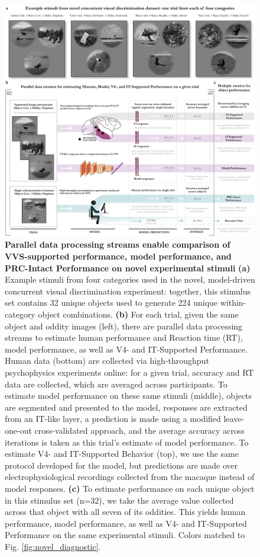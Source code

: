 \documentclass[11pt]{article}
\begin{document}
\begin{figure}[ht]
\centering
\includegraphics[width=\linewidth]{figures/novel_protocol_flow}
\caption{\textbf{Parallel data processing streams enable comparison of VVS-supported performance, model performance, and PRC-Intact Performance on novel experimental stimuli} \textbf{(a)} Example stimuli from four categories used in the novel, model-driven concurrent visual discrimination experiment: together, this stimulus set contains 32 unique objects used to generate 224 unique within-category object combinations. \textbf{(b)} For each trial, given the same object and oddity images (left), there are parallel data processing streams to estimate human performance and Reaction time (RT), model performance, as well as V4- and IT-Supported Performance. Human data (bottom) are collected via high-throughput psychophysics experiments online: for a given trial, accuracy and RT data are collected, which are averaged across participants. To estimate model performance on these same stimuli (middle), objects are segmented and presented to the model, responses are extracted from an IT-like layer, a prediction is made using a modified leave-one-out cross-validated approach, and the average accuracy across iterations is taken as this trial's estimate of model performance. To estimate V4- and IT-Supported Behavior (top), we use the same protocol developed for the model, but predictions are made over electrophysiological recordings collected from the macaque\cite{majaj2015simple} instead of model responses. \textbf{(c)} To estimate performance on each unique object in this stimulus set (n=32), we take the average value collected across that object with all seven of its oddities. This yields human performance, model performance, as well as V4- and IT-Supported Performance on the same experimental stimuli. Colors matched to Fig. \ref{fig:novel_diagnostic}.}
\label{fig:novel_protocol_flow}
\end{figure}
\end{document}
